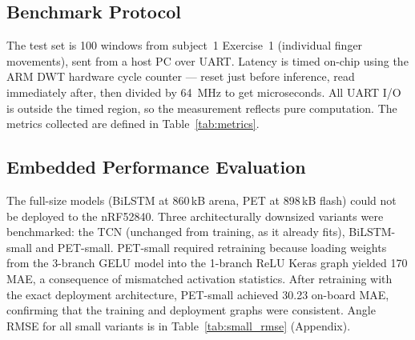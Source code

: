 \documentclass[11pt]{article}
\begin{document}
\subsection{Benchmark Protocol}
\label{sec:bench_method}

The test set is 100 windows from subject~1 Exercise~1 (individual finger movements), sent from a host PC over UART. Latency is timed on-chip using the ARM DWT hardware cycle counter — reset just before inference, read immediately after, then divided by 64~MHz to get microseconds. All UART I/O is outside the timed region, so the measurement reflects pure computation. The metrics collected are defined in Table~\ref{tab:metrics}.

\begin{table}[H]
\centering
\caption{Metrics recorded for each deployed model.}
\label{tab:metrics}
\renewcommand{\arraystretch}{0.85}
\end{table}

\subsection{Embedded Performance Evaluation}

The full-size models (BiLSTM at 860\,kB arena, PET at 898\,kB flash) could not be deployed to the nRF52840. Three architecturally downsized variants were benchmarked: the TCN (unchanged from training, as it already fits), BiLSTM-small and PET-small. PET-small required retraining because loading weights from the 3-branch GELU model into the 1-branch ReLU Keras graph yielded 170\textdegree{} MAE, a consequence of mismatched activation statistics. After retraining with the exact deployment architecture, PET-small achieved 30.23\textdegree{} on-board MAE, confirming that the training and deployment graphs were consistent. Angle RMSE for all small variants is in Table~\ref{tab:small_rmse} (Appendix).
\end{document}
